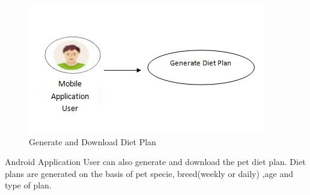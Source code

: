 \newpage
\begin{figure}[H]
  \centering
    \includegraphics{34UseCase}
     \caption{Generate and Download Diet Plan}
\end{figure}
Android Application User can also generate and download the pet diet plan. Diet plans are generated on the basis of pet specie, breed(weekly or daily) ,age and type of plan.
